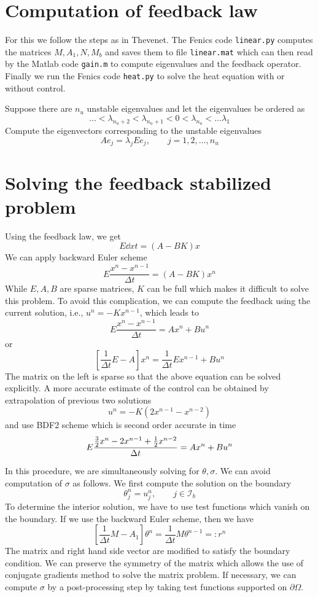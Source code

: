 \documentclass[11pt, oneside]{article}   	%
\newcommand{\bOmega}{{\partial\Omega}}
\newcommand{\ind}{\mathcal{I}}
\newcommand{\bind}{\ind_b}
\newcommand{\nr}{{n_u}}
\begin{document}
\section{Computation of feedback law}
For this we follow the steps as in Thevenet. The Fenics code \texttt{linear.py} computes the matrices $M,A_1,N,M_b$ and saves them to file \texttt{linear.mat} which can then read by the Matlab code \texttt{gain.m} to compute eigenvalues and the feedback operator. Finally we run the Fenics code \texttt{heat.py} to solve the heat equation with or without control.

Suppose there are $\nr$ unstable eigenvalues and let the eigenvalues be ordered as
\[
\ldots < \lambda_{\nr+2} < \lambda_{\nr+1} < 0 < \lambda_\nr < \ldots \lambda_1
\]
Compute the eigenvectors corresponding to the unstable eigenvalues
\[
A e_j = \lambda_j E e_j, \qquad j=1,2,\ldots,\nr
\]
\section{Solving the feedback stabilized problem}
Using the feedback law, we get
\[
E\dd{x}{t} = (A-BK)x
\]
We can apply backward Euler scheme
\[
E \frac{x^n - x^{n-1}}{\Delta t} = (A-BK)x^n
\]
While $E,A,B$ are sparse matrices, $K$ can be full which makes it difficult to solve this problem. To avoid this complication, we can compute the feedback using the current solution, i.e., $u^n = -K x^{n-1}$, which leads to
\[
E \frac{x^n - x^{n-1}}{\Delta t} = A x^n + B u^n
\]
or
\[
\left[ \frac{1}{\Delta t}E - A \right] x^n = \frac{1}{\Delta t}E x^{n-1} + Bu^n
\]
The matrix on the left is sparse so that the above equation can be solved explicitly. A more accurate estimate of the control can be obtained by extrapolation of previous two solutions
\[
u^n  = -K (2x^{n-1} - x^{n-2})
\]
and use BDF2 scheme which is second order accurate in time
\[
E \frac{\frac{3}{2}x^n - 2x^{n-1} + {\frac{1}{2}} x^{n-2}}{\Delta t} = A x^n + B u^n
\]

In this procedure, we are simultaneously solving for $\theta, \sigma$. We can avoid computation of $\sigma$ as follows. We first compute the solution on the boundary
\[
\theta_j^n = u_j^n, \qquad j \in \bind
\]
To determine the interior solution, we have to use test functions which vanish on the boundary. If we use the backward Euler scheme, then we have
\[
\left[ \frac{1}{\Delta t}M - A_1 \right] \theta^n = \frac{1}{\Delta t}M \theta^{n-1} =: r^n
\]
The matrix and right hand side vector are modified to satisfy the boundary condition. We can preserve the symmetry of the matrix which allows the use of conjugate gradients method to solve the matrix problem. If necessary, we can compute $\sigma$ by a post-processing step by taking test functions supported on $\bOmega$.
\end{document}
